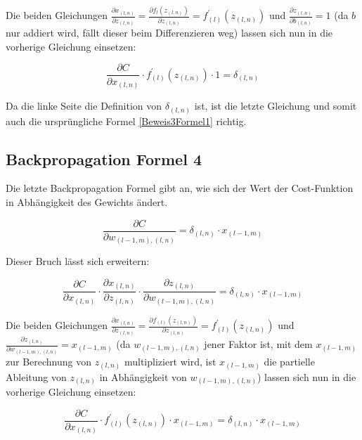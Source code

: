 \documentclass[a4paper,12pt,ngerman,oneside]{scrreprt}	%
\begin{document}
			Die beiden Gleichungen $\frac{\partial x_{(l,n)}}{\partial z_{(l,n)}} = \frac{\partial f_{l}(z_{(l,n)})}{\partial z_{(l,n)}} = f_{(l)}^{\prime} (z_{(l,n)})$ und $\frac{\partial z_{(l,n)}}{\partial b_{(l,n)}} = 1$ (da $b$ nur addiert wird, fällt dieser beim Differenzieren weg) lassen sich nun in die vorherige Gleichung einsetzen:

			\begin{equation}
				\frac{\partial C}{\partial x_{(l,n)}} \cdot f_{(l)}^{\prime} (z_{(l,n)}) \cdot 1 = \delta_{(l,n)}
			\end{equation}
			
			Da die linke Seite die Definition von $\delta_{(l,n)}$ ist, ist die letzte Gleichung und somit auch die ursprüngliche Formel \ref{Beweis3Formel1} richtig. 
			
			
			
			\subsection*{Backpropagation Formel 4}
			Die letzte Backpropagation Formel gibt an, wie sich der Wert der Cost-Funktion in Abhängigkeit des Gewichts ändert. 
			
			\begin{equation}
				\frac{\partial C}{\partial w_{(l-1,m), (l,n)}} = \delta_{(l,n)} \cdot x_{(l-1,m)}
			\end{equation}
			
			Dieser Bruch lässt sich erweitern:
			
			\begin{equation}
				\frac{\partial C}{\partial x_{(l,n)}} \cdot \frac{\partial x_{(l,n)}}{\partial z_{(l,n)}} \cdot \frac{\partial z_{(l,n)}}{\partial w_{(l-1,m), (l,n)}} = \delta_{(l,n)} \cdot x_{(l-1,m)}
			\end{equation}
			
			Die beiden Gleichungen $\frac{\partial x_{(l,n)}}{\partial z_{(l,n)}} = \frac{\partial f_{(l)}(z_{(l,n)})}{\partial z_{(l,n)}} = f_{(l)}^{\prime}(z_{(l,n)})$ und $\frac{\partial z_{(l,n)}}{\partial w_{(l-1,m), (l,n)}} = x_{(l-1,m)}$ (da $w_{(l-1,m), (l,n)}$ jener Faktor ist, mit dem $x_{(l-1,m)}$ zur Berechnung von $z_{(l,n)}$ multipliziert wird, ist $x_{(l-1,m)}$ die partielle Ableitung von $z_{(l,n)}$ in Abhängigkeit von $w_{(l-1,m), (l,n)}$) lassen sich nun in die vorherige Gleichung einsetzen:
			
			\begin{equation}
				\frac{\partial C}{\partial x_{(l,n)}} \cdot f_{(l)}^{\prime}(z_{(l,n)}) \cdot x_{(l-1,m)} = \delta_{(l,n)} \cdot x_{(l-1,m)}
			\end{equation}
			
\end{document}
